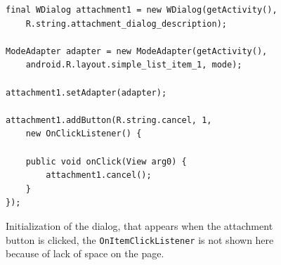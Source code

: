 \begin{figure}[H]
\begin{lstlisting}
final WDialog attachment1 = new WDialog(getActivity(),
	R.string.attachment_dialog_description);

ModeAdapter adapter = new ModeAdapter(getActivity(),
	android.R.layout.simple_list_item_1, mode);

attachment1.setAdapter(adapter);

attachment1.addButton(R.string.cancel, 1,
	new OnClickListener() {

	public void onClick(View arg0) {
		attachment1.cancel();
	}
});
\end{lstlisting}
\caption{Initialization of the dialog, that appears when the attachment button is clicked, the \texttt{OnItemClickListener} is not shown here because of lack of space on the page.}%
\label{code:customize:wdialog}%
\end{figure}